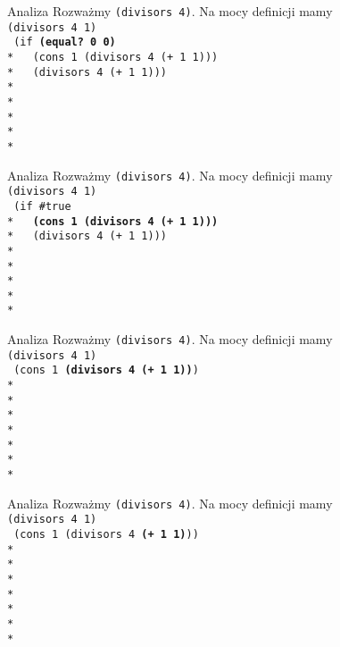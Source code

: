\begin{frame}{Analiza}
  Rozważmy \texttt{(divisors 4)}. Na mocy definicji mamy\\
  \texttt{(divisors 4 1)}\\
  \texttt{
(if \textbf{(equal?\ 0 0)}\\*
\ \ (cons 1 (divisors 4 (+ 1 1)))\\*
\ \ (divisors 4 (+ 1 1)))\\*
\ \\*
\ \\*
\ \\*
\ \\*
}
\end{frame}

\begin{frame}{Analiza}
  Rozważmy \texttt{(divisors 4)}. Na mocy definicji mamy\\
  \texttt{(divisors 4 1)}\\
  \texttt{
(if \#true\\*
\ \ \textbf{(cons 1 (divisors 4 (+ 1 1)))}\\*
\ \ (divisors 4 (+ 1 1)))\\*
\ \\*
\ \\*
\ \\*
\ \\*
}
\end{frame}


\begin{frame}{Analiza}
  Rozważmy \texttt{(divisors 4)}. Na mocy definicji mamy\\
  \texttt{(divisors 4 1)}\\
  \texttt{
(cons 1 \textbf{(divisors 4 (+ 1 1))})\\*
\ \\*    
\ \\*
\ \\*
\ \\*
\ \\*
\ \\*
  }
\end{frame}

\begin{frame}{Analiza}
  Rozważmy \texttt{(divisors 4)}. Na mocy definicji mamy\\
  \texttt{(divisors 4 1)}\\
  \texttt{
(cons 1 (divisors 4 \textbf{(+ 1 1)}))\\*
\ \\*    
\ \\*
\ \\*
\ \\*
\ \\*
\ \\*
  }
\end{frame}

